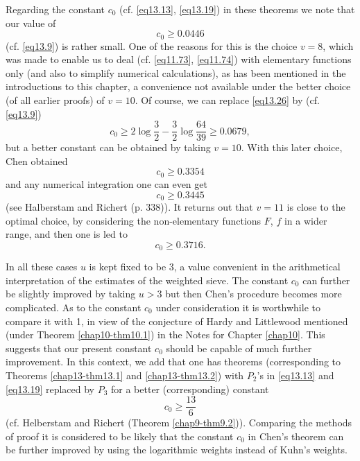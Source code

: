 Regarding the constant $c_0$ (cf. \eqref{eq13.13}, \eqref{eq13.19}) in
these theorems we note that our value of  
\begin{equation*}
c_0 \ge 0.0446\tag{13.26}\label{eq13.26}
\end{equation*} 
(cf. \eqref{eq13.9}) is rather small. One of the reasons for this is
the choice $v=8$, which was made to enable us to deal
(cf. \eqref{eq11.73}, \eqref{eq11.74}) with elementary functions only
(and also to 
simplify numerical calculations), as has been mentioned in the
introductions to this chapter, a convenience not available under the
better choice (of all earlier proofs) of $v=10$. Of course, we can
replace \eqref{eq13.26} by (cf. \eqref{eq13.9}) 
\begin{equation*}
c_0 \ge 2 \log \frac{3}{2}- \frac{3}{2} \log \frac{64}{39} \ge
0.0679,\tag{13.27}\label{eq13.27} 
\end{equation*}     
 but a better constant can be obtained by taking $v=10$. With this
 later choice, Chen \cite{key1} obtained  
 \begin{equation*}
c_0 \ge 0.3354\tag{13.28}\label{eq13.28}
\end{equation*}   
and any numerical integration one can even get
\begin{equation*}
c_0 \ge 0.3445\tag{13.29}\label{eq13.29}
\end{equation*}
(see Halberstam and Richert \cite{key1} (p. 338)). It returns out that
$v=11$ is close to the optimal choice, by considering the
non-elementary functions $F$, $f$ in a  wider range, and then one is
led to  
\begin{equation*}
c_0 \ge 0.3716.\tag{13.30}\label{eq13.30}
\end{equation*}\pageoriginale

In all these cases $u$ is kept fixed to be 3, a value convenient in
the arithmetical interpretation of the estimates of the weighted
sieve. The constant $c_0$ can further be slightly  improved by taking
$u>3$ but then Chen's procedure becomes more complicated. As to the
constant $c_0$ under consideration it is worthwhile to compare it
with 1, in view of the conjecture of Hardy and Littlewood mentioned
(under Theorem \ref{chap10-thm10.1}) in the Notes for Chapter
\ref{chap10}. This suggests 
that our present constant $c_0$ should be capable of much further
improvement. In this context, we add that one has theorems
(corresponding to Theorems \ref{chap13-thm13.1} and
\ref{chap13-thm13.2}) with $P_2$'s in 
\eqref{eq13.13} and \eqref{eq13.19} replaced by $P_3$ for a better
(corresponding) constant  
\begin{equation*}
c_0 \ge \frac{13}{6}\tag{13.31}\label{eq13.31}
\end{equation*}
(cf. Helberstam and Richert \cite{key1} (Theorem
\ref{chap9-thm9.2})). Comparing the 
methods of proof it is considered to be likely  that the constant
$c_0$ in Chen's theorem can be further improved by using the
logarithmic weights instead of Kuhn's weights. 

